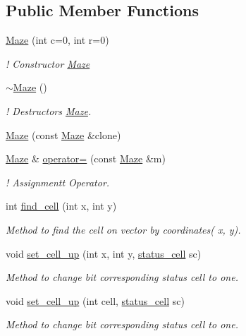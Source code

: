 \subsection*{Public Member Functions}
\begin{DoxyCompactItemize}
\item 
\hyperlink{classMaze_aa744020bbce986ebc4d33f30b7a2d52f}{Maze} (int c=0, int r=0)
\begin{DoxyCompactList}\small\item\em ! Constructor \hyperlink{classMaze}{Maze} \end{DoxyCompactList}\item 
\hyperlink{classMaze_a4f187353f595193318ac66133a22287e}{$\sim$\+Maze} ()
\begin{DoxyCompactList}\small\item\em ! Destructors \hyperlink{classMaze}{Maze}. \end{DoxyCompactList}\item 
\hyperlink{classMaze_ace1fa70e147e319c7ff135f1ca1bd0e3}{Maze} (const \hyperlink{classMaze}{Maze} \&clone)
\item 
\hyperlink{classMaze}{Maze} \& \hyperlink{classMaze_a41468a30ae450b06d4a07304e9cda5ed}{operator=} (const \hyperlink{classMaze}{Maze} \&m)
\begin{DoxyCompactList}\small\item\em ! Assignmentt Operator. \end{DoxyCompactList}\item 
int \hyperlink{classMaze_aa59b935dcd5f7129636cea6e40882c56}{find\+\_\+cell} (int x, int y)
\begin{DoxyCompactList}\small\item\em Method to find the cell on vector by coordinates( x, y). \end{DoxyCompactList}\item 
void \hyperlink{classMaze_aa7c832a91a3db8f48b31f688332f8986}{set\+\_\+cell\+\_\+up} (int x, int y, \hyperlink{classMaze_a07167e321eac2b67100fb82ecb98f1d1}{status\+\_\+cell} sc)
\begin{DoxyCompactList}\small\item\em Method to change bit corresponding status cell to one. \end{DoxyCompactList}\item 
void \hyperlink{classMaze_a53781b836de1a6b2c7ded74a2798b703}{set\+\_\+cell\+\_\+up} (int cell, \hyperlink{classMaze_a07167e321eac2b67100fb82ecb98f1d1}{status\+\_\+cell} sc)
\begin{DoxyCompactList}\small\item\em Method to change bit corresponding status cell to one. \end{DoxyCompactList}\item 

\end{DoxyCompactItemize}
